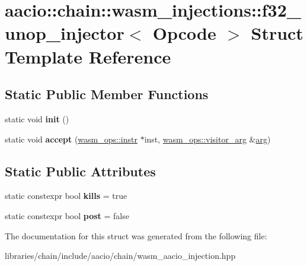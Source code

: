 \hypertarget{structaacio_1_1chain_1_1wasm__injections_1_1f32__unop__injector}{}\section{aacio\+:\+:chain\+:\+:wasm\+\_\+injections\+:\+:f32\+\_\+unop\+\_\+injector$<$ Opcode $>$ Struct Template Reference}
\label{structaacio_1_1chain_1_1wasm__injections_1_1f32__unop__injector}
\subsection*{Static Public Member Functions}
\begin{DoxyCompactItemize}
\item 
\mbox{\label{structaacio_1_1chain_1_1wasm__injections_1_1f32__unop__injector_a6ba6a71eedebf62936b62147326f0e28}} 
static void {\bfseries init} ()
\item 
\mbox{\label{structaacio_1_1chain_1_1wasm__injections_1_1f32__unop__injector_a9b66f55d345a6da250cbfd2d9f337070}} 
static void {\bfseries accept} (\mbox{\hyperlink{structaacio_1_1chain_1_1wasm__ops_1_1instr}{wasm\+\_\+ops\+::instr}} $\ast$inst, \mbox{\hyperlink{structaacio_1_1chain_1_1wasm__ops_1_1visitor__arg}{wasm\+\_\+ops\+::visitor\+\_\+arg}} \&\mbox{\hyperlink{unionarg}{arg}})
\end{DoxyCompactItemize}
\subsection*{Static Public Attributes}
\begin{DoxyCompactItemize}
\item 
\mbox{\label{structaacio_1_1chain_1_1wasm__injections_1_1f32__unop__injector_a29975a4b0844ebd9d1fda07bd881b9a7}} 
static constexpr bool {\bfseries kills} = true
\item 
\mbox{\label{structaacio_1_1chain_1_1wasm__injections_1_1f32__unop__injector_a883b4d254f251fe8217c7552555c1087}} 
static constexpr bool {\bfseries post} = false
\end{DoxyCompactItemize}


The documentation for this struct was generated from the following file\+:\begin{DoxyCompactItemize}
\item 
libraries/chain/include/aacio/chain/wasm\+\_\+aacio\+\_\+injection.\+hpp\end{DoxyCompactItemize}
